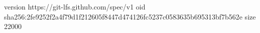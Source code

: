 version https://git-lfs.github.com/spec/v1
oid sha256:2fe9252f2a4f79d1f212605f8447d474126fc5237c0583635b695313bf7b562e
size 22000

